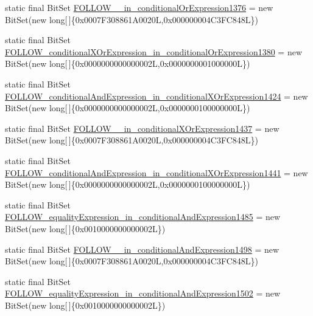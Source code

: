 \begin{DoxyCompactItemize}
\item 
static final Bit\-Set \hyperlink{classorg_1_1tzi_1_1use_1_1parser_1_1shell_1_1_shell_command_parser_a36e49d3546345b7dcb3b3ff041958456}{F\-O\-L\-L\-O\-W\-\_\-\_\-in\-\_\-conditional\-Or\-Expression1376} = new Bit\-Set(new long\mbox{[}$\,$\mbox{]}\{0x0007\-F308861\-A0020\-L,0x000000004\-C3\-F\-C848\-L\})
\item 
static final Bit\-Set \hyperlink{classorg_1_1tzi_1_1use_1_1parser_1_1shell_1_1_shell_command_parser_a8ce848eaced1fe168c4b7da1fbd6f717}{F\-O\-L\-L\-O\-W\-\_\-conditional\-X\-Or\-Expression\-\_\-in\-\_\-conditional\-Or\-Expression1380} = new Bit\-Set(new long\mbox{[}$\,$\mbox{]}\{0x0000000000000002\-L,0x0000000001000000\-L\})
\item 
static final Bit\-Set \hyperlink{classorg_1_1tzi_1_1use_1_1parser_1_1shell_1_1_shell_command_parser_a3ec2287541ddb67ddc8b7b7d02d4db5e}{F\-O\-L\-L\-O\-W\-\_\-conditional\-And\-Expression\-\_\-in\-\_\-conditional\-X\-Or\-Expression1424} = new Bit\-Set(new long\mbox{[}$\,$\mbox{]}\{0x0000000000000002\-L,0x0000000100000000\-L\})
\item 
static final Bit\-Set \hyperlink{classorg_1_1tzi_1_1use_1_1parser_1_1shell_1_1_shell_command_parser_a8139d82fde7184445b1fb6a09af75736}{F\-O\-L\-L\-O\-W\-\_\-\_\-in\-\_\-conditional\-X\-Or\-Expression1437} = new Bit\-Set(new long\mbox{[}$\,$\mbox{]}\{0x0007\-F308861\-A0020\-L,0x000000004\-C3\-F\-C848\-L\})
\item 
static final Bit\-Set \hyperlink{classorg_1_1tzi_1_1use_1_1parser_1_1shell_1_1_shell_command_parser_a643354c68845f8ec5084a757c1c21837}{F\-O\-L\-L\-O\-W\-\_\-conditional\-And\-Expression\-\_\-in\-\_\-conditional\-X\-Or\-Expression1441} = new Bit\-Set(new long\mbox{[}$\,$\mbox{]}\{0x0000000000000002\-L,0x0000000100000000\-L\})
\item 
static final Bit\-Set \hyperlink{classorg_1_1tzi_1_1use_1_1parser_1_1shell_1_1_shell_command_parser_a3329525d44914c2950a37be01a20fbe7}{F\-O\-L\-L\-O\-W\-\_\-equality\-Expression\-\_\-in\-\_\-conditional\-And\-Expression1485} = new Bit\-Set(new long\mbox{[}$\,$\mbox{]}\{0x0010000000000002\-L\})
\item 
static final Bit\-Set \hyperlink{classorg_1_1tzi_1_1use_1_1parser_1_1shell_1_1_shell_command_parser_acfd8ffad6d5f086f3111a77b9a305507}{F\-O\-L\-L\-O\-W\-\_\-\_\-in\-\_\-conditional\-And\-Expression1498} = new Bit\-Set(new long\mbox{[}$\,$\mbox{]}\{0x0007\-F308861\-A0020\-L,0x000000004\-C3\-F\-C848\-L\})
\item 
static final Bit\-Set \hyperlink{classorg_1_1tzi_1_1use_1_1parser_1_1shell_1_1_shell_command_parser_a176ad369fed72d7657954d8efdefaf60}{F\-O\-L\-L\-O\-W\-\_\-equality\-Expression\-\_\-in\-\_\-conditional\-And\-Expression1502} = new Bit\-Set(new long\mbox{[}$\,$\mbox{]}\{0x0010000000000002\-L\})

\end{DoxyCompactItemize}
